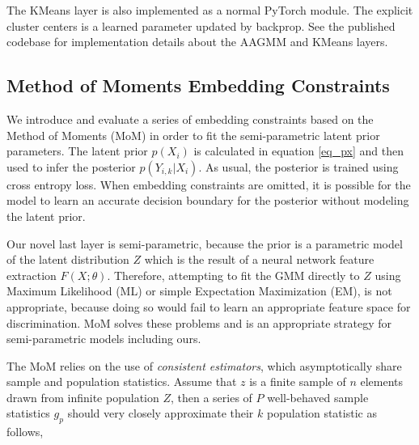 \documentclass[10pt,twocolumn,letterpaper]{article}
\begin{document}

The KMeans layer is also implemented as a normal PyTorch \cite{pytorch} module.
The explicit cluster centers is a learned parameter updated by backprop.
See the published codebase for implementation details about the AAGMM and KMeans layers.




\subsection{Method of Moments Embedding Constraints}

We introduce and evaluate a series of embedding constraints based on the Method of Moments (MoM) \cite{pearson1936method} in order to fit the semi-parametric latent prior parameters.  
The latent prior $p(X_i)$ is calculated in equation \ref{eq_px} and then used to infer the posterior $p(Y_{i,k}|X_i)$.
As usual, the posterior is trained using cross entropy loss.  
When embedding constraints are omitted, it is possible for the model to learn an accurate decision boundary for the posterior without modeling the latent prior.

Our novel last layer is semi-parametric, because the prior is a parametric model of the latent distribution $Z$ which is the result of a neural network feature extraction $F(X;\theta)$. 
Therefore, attempting to fit the GMM directly to $Z$ using Maximum Likelihood (ML) or simple Expectation Maximization (EM), is not appropriate, because doing so would fail to learn an appropriate feature space for discrimination.
MoM solves these problems and is an appropriate strategy for semi-parametric models including ours.

The MoM relies on the use of \textit{consistent estimators}, which asymptotically share sample and population statistics.
Assume that $z$ is a finite sample of $n$ elements drawn from infinite population $Z$, then a series of $P$ well-behaved sample statistics $g_p$ should very closely approximate their $k$ population statistic as follows,
\end{document}
